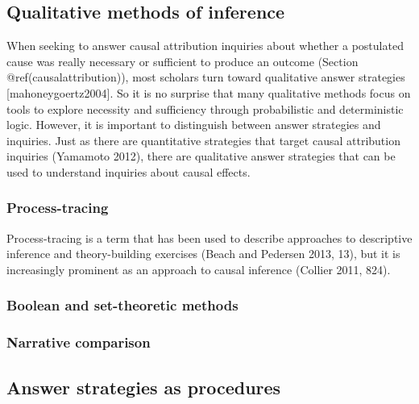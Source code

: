 \documentclass[
]{article}
\begin{document}
\hypertarget{qualitative-methods-of-inference}{%
\subsection{Qualitative methods of
inference}\label{qualitative-methods-of-inference}}

When seeking to answer causal attribution inquiries about whether a
postulated cause was really necessary or sufficient to produce an
outcome (Section @ref(causalattribution)), most scholars turn toward
qualitative answer strategies {[}mahoneygoertz2004{]}. So it is no
surprise that many qualitative methods focus on tools to explore
necessity and sufficiency through probabilistic and deterministic logic.
However, it is important to distinguish between answer strategies and
inquiries. Just as there are quantitative strategies that target causal
attribution inquiries (Yamamoto 2012), there are qualitative answer
strategies that can be used to understand inquiries about causal
effects.

\hypertarget{process-tracing}{%
\subsubsection{Process-tracing}\label{process-tracing}}

Process-tracing is a term that has been used to describe approaches to
descriptive inference and theory-building exercises (Beach and Pedersen
2013, 13), but it is increasingly prominent as an approach to causal
inference (Collier 2011, 824).

\hypertarget{boolean-and-set-theoretic-methods}{%
\subsubsection{Boolean and set-theoretic
methods}\label{boolean-and-set-theoretic-methods}}

\hypertarget{narrative-comparison}{%
\subsubsection{Narrative comparison}\label{narrative-comparison}}

\hypertarget{answer-strategies-as-procedures}{%
\subsection{Answer strategies as
procedures}\label{answer-strategies-as-procedures}}
\end{document}
